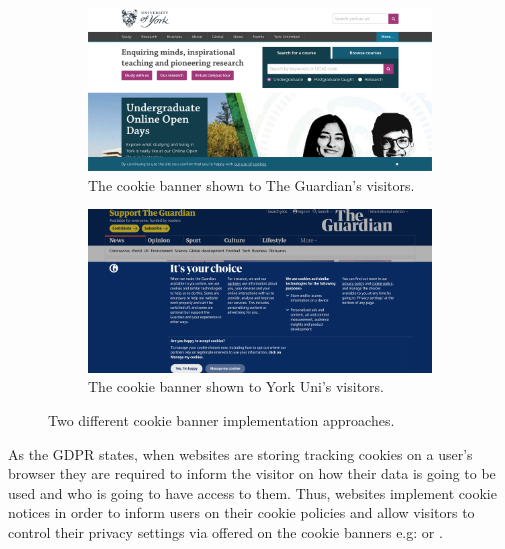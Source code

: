 \documentclass[../main.tex]{subfiles}
\begin{document}
\begin{figure}[ht!]
    \centering
    \begin{subfigure}[b]{0.45\textwidth}
        \includegraphics[width=\textwidth]{images/intro/guardian}
        \caption{The  cookie banner shown to The Guardian's visitors.}
        \label{fig:intro_cookie_guardian}
    \end{subfigure}
    \hfill
    \begin{subfigure}[b]{0.45\textwidth}
        \includegraphics[width=\textwidth]{images/intro/york}
        \caption{The  cookie banner shown to York Uni's visitors.}
        \label{fig:intro_cookie_york}
    \end{subfigure}
    \caption{Two different cookie banner implementation approaches.}
    \label{fig:intro_cookie}
\end{figure}

As the GDPR states, when websites are storing tracking cookies on a user’s browser they are required to inform the visitor on how their data is going to be used and who is going to have access to them. Thus, websites implement cookie notices in order to inform users on their cookie policies and allow visitors to control their privacy settings via  offered on the cookie banners e.g:  or .
\end{document}
